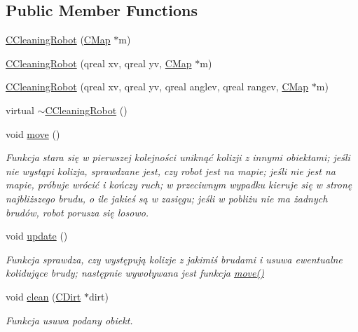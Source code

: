 \subsection*{Public Member Functions}
\begin{DoxyCompactItemize}
\item 
\mbox{\hyperlink{class_c_cleaning_robot_a0d304b4d201832056a946d6ee0a1141c}{C\+Cleaning\+Robot}} (\mbox{\hyperlink{class_c_map}{C\+Map}} $\ast$m)
\item 
\mbox{\hyperlink{class_c_cleaning_robot_ae22783fb4dd66322b3d63e2ac6beb4a6}{C\+Cleaning\+Robot}} (qreal xv, qreal yv, \mbox{\hyperlink{class_c_map}{C\+Map}} $\ast$m)
\item 
\mbox{\hyperlink{class_c_cleaning_robot_af00faa2e7ae3c1b62a026abe39df0a44}{C\+Cleaning\+Robot}} (qreal xv, qreal yv, qreal anglev, qreal rangev, \mbox{\hyperlink{class_c_map}{C\+Map}} $\ast$m)
\item 
virtual \mbox{\hyperlink{class_c_cleaning_robot_a8622a44357356261e13c30de8915381b}{$\sim$\+C\+Cleaning\+Robot}} ()
\item 
void \mbox{\hyperlink{class_c_cleaning_robot_a1ad227a5f3508a8e78fcecae7d3de53b}{move}} ()
\begin{DoxyCompactList}\small\item\em Funkcja stara się w pierwszej kolejności uniknąć kolizji z innymi obiektami; jeśli nie wystąpi kolizja, sprawdzane jest, czy robot jest na mapie; jeśli nie jest na mapie, próbuje wrócić i kończy ruch; w przeciwnym wypadku kieruje się w stronę najbliższego brudu, o ile jakieś są w zasięgu; jeśli w pobliżu nie ma żadnych brudów, robot porusza się losowo. \end{DoxyCompactList}\item 
void \mbox{\hyperlink{class_c_cleaning_robot_afd8b3a58abfc91ebdce32af3686c5e9f}{update}} ()
\begin{DoxyCompactList}\small\item\em Funkcja sprawdza, czy występują kolizje z jakimiś brudami i usuwa ewentualne kolidujące brudy; następnie wywoływana jest funkcja \mbox{\hyperlink{class_c_cleaning_robot_a1ad227a5f3508a8e78fcecae7d3de53b}{move()}} \end{DoxyCompactList}\item 
void \mbox{\hyperlink{class_c_cleaning_robot_a1c106e1736653d8c0f24fbb9f1820f79}{clean}} (\mbox{\hyperlink{class_c_dirt}{C\+Dirt}} $\ast$dirt)
\begin{DoxyCompactList}\small\item\em Funkcja usuwa podany obiekt. \end{DoxyCompactList}\end{DoxyCompactItemize}
